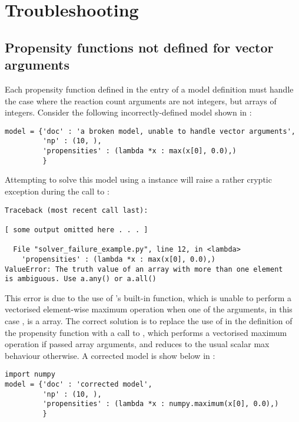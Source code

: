 \section{Troubleshooting}

\subsection{Propensity functions not defined for vector arguments}

Each propensity function defined in the  entry
of a model definition must handle the case where the reaction count
arguments are not integers, but \numpy{} arrays of integers.
Consider the following incorrectly-defined model shown in
:
\begin{lstlisting}[frame=tb,
caption={A broken model},
label=brokenModel]
model = {'doc' : 'a broken model, unable to handle vector arguments',
         'np' : (10, ),
         'propensities' : (lambda *x : max(x[0], 0.0),)
         }
\end{lstlisting}
Attempting to solve this model using a  instance will raise a
rather cryptic exception during the call to :
\begin{verbatim}
Traceback (most recent call last):

[ some output omitted here . . . ]

  File "solver_failure_example.py", line 12, in <lambda>
    'propensities' : (lambda *x : max(x[0], 0.0),)
ValueError: The truth value of an array with more than one element
is ambiguous. Use a.any() or a.all()
\end{verbatim}
This error is due to the use of \python{}'s built-in  function,
which is unable to perform a vectorised element-wise maximum operation when one
of the arguments, in this case , is a \numpy{} array. The
correct solution is to replace the use of  in the definition of the
propensity function with a call to , which performs a
vectorised maximum operation if passed array arguments, and reduces to the
usual scalar max behaviour otherwise. A corrected model is show below in
:
\begin{lstlisting}[frame=tb,
caption={A corrected model},
label=correctedModel]
import numpy
model = {'doc' : 'corrected model',
         'np' : (10, ),
         'propensities' : (lambda *x : numpy.maximum(x[0], 0.0),)
         }
\end{lstlisting}


